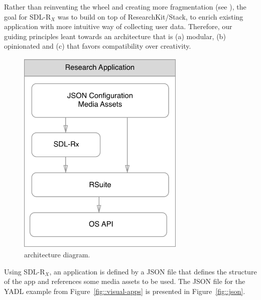 \documentclass{acm_proc_article-sp}
\newcommand{\sdlrx}{SDL-R$_X$}
\begin{document}
Rather than reinventing the wheel and creating more fragmentation (see \cite{noauthor_undated-ej}), the goal for \sdlrx{} was to build on top of ResearchKit/Stack, to enrich existing application with more intuitive way of collecting user data. Therefore, our guiding principles leant towards an architecture that is (a) modular, (b) opinionated and (c) that favors compatibility over creativity.

\begin{figure}[h!]
\centering
\includegraphics[width=8cm]{IMG/architecture.png}
\caption{architecture diagram.}
\label{fig::architecture}
\end{figure}

Using \sdlrx{}, an application is defined by a JSON file that defines the structure of the app and references some media assets to be used. The JSON file for the YADL example from Figure~\ref{fig::visual-apps} is presented in Figure~\ref{fig::json}.
\end{document}
